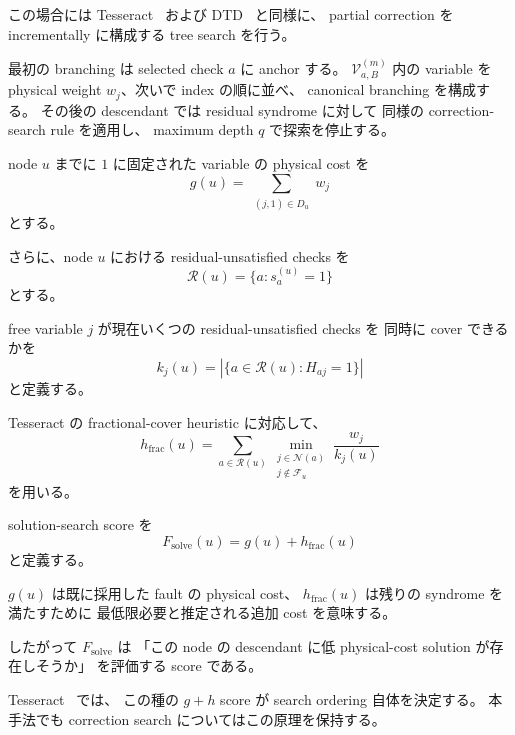 この場合には Tesseract~\cite{tesseract} および
DTD~\cite{dtd} と同様に、
partial correction を incrementally に構成する tree search を行う。

最初の branching は selected check $a$ に anchor する。
$\mathcal{V}_{a,B}^{(m)}$ 内の variable を physical weight
$w_j$、次いで index の順に並べ、
canonical branching を構成する。
その後の descendant では residual syndrome に対して
同様の correction-search rule を適用し、
maximum depth $q$ で探索を停止する。

node $u$ までに $1$ に固定された variable の physical cost を
\begin{equation}
    g(u)
    =
    \sum_{\substack{(j,1)\in D_u}} w_j
\end{equation}
とする。

さらに、node $u$ における residual-unsatisfied checks を
\begin{equation}
    \mathcal{R}(u)
    =
    \{a:s_a^{(u)}=1\}
\end{equation}
とする。

free variable $j$ が現在いくつの residual-unsatisfied checks を
同時に cover できるかを
\begin{equation}
    k_j(u)
    =
    \left|
        \{a\in\mathcal{R}(u):H_{aj}=1\}
    \right|
\end{equation}
と定義する。

Tesseract の fractional-cover heuristic に対応して、
\begin{equation}
    h_{\mathrm{frac}}(u)
    =
    \sum_{a\in\mathcal{R}(u)}
    \min_{\substack{
        j\in\mathcal{N}(a)\\
        j\notin\mathcal{F}_u
    }}
    \frac{w_j}{k_j(u)}
    \label{eq:fractional_heuristic}
\end{equation}
を用いる。

solution-search score を
\begin{equation}
    \boxed{
    F_{\mathrm{solve}}(u)
    =
    g(u)+h_{\mathrm{frac}}(u)
    }
    \label{eq:fsolve}
\end{equation}
と定義する。

$g(u)$ は既に採用した fault の physical cost、
$h_{\mathrm{frac}}(u)$ は残りの syndrome を満たすために
最低限必要と推定される追加 cost を意味する。

したがって $F_{\mathrm{solve}}$ は
「この node の descendant に低 physical-cost solution が存在しそうか」
を評価する score である。

Tesseract~\cite{tesseract} では、
この種の $g+h$ score が search ordering 自体を決定する。
本手法でも correction search についてはこの原理を保持する。


